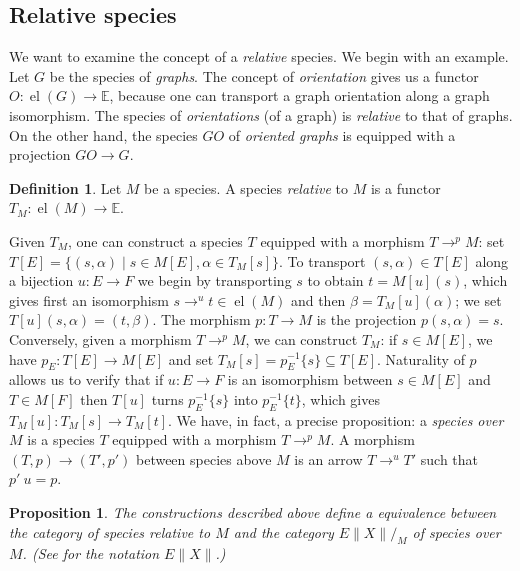 \documentclass{amsart}
\newtheorem{prop}[thm]{Proposition}
\theoremstyle{definition}
\newtheorem{defn}[thm]{Definition}
\theoremstyle{remark}
\newcommand{\E}{\mathbb{E}}
\DeclareMathOperator{\el}{el}
\newcommand{\term}[1]{\emph{#1}}
\newcommand{\pref}[1]{\prettyref{#1}}
\begin{document}
\subsection{Relative species}
\label{sec:relative-species}

We want to examine the concept of a \emph{relative} species. We begin
with an example. Let $G$ be the species of \emph{graphs}. The concept
of \emph{orientation} gives us a functor $O : \el (G) \to \E$, because
one can transport a graph orientation along a graph isomorphism. The
species of \emph{orientations} (of a graph) is \emph{relative} to that
of graphs. On the other hand, the species $GO$ of \emph{oriented
  graphs} is equipped with a projection $GO \to G$.

\begin{defn}
  Let $M$ be a species. A species \emph{relative} to $M$ is a functor
  $T_M : \el (M) \to \E$.
\end{defn}

Given $T_M$, one can construct a species $T$
equipped with a morphism $T \to^p M$: set $T [E] = \{(s, \alpha) \mid
s \in M [E], \alpha \in T_M[s]\}$. To transport $(s, \alpha) \in T[E]$
along a bijection $u : E \to F$ we begin by transporting $s$ to obtain
$t = M [u] (s)$, which gives first an isomorphism $s \to^u t \in
\el(M)$ and then $\beta = T_M [u] (\alpha)$; we set $T [u] (s, \alpha)
= (t, \beta)$. The morphism $p : T \to M$ is the projection $p (s,
\alpha) = s$. Conversely, given a morphism $T \to^p M$, we can
construct $T_M$: if $s \in M [E]$, we have $p_E: T [E] \to M [E]$ and
set $T_M [s] = p_E^{-1}\{s\} \subseteq T [E]$. Naturality of $p$
allows us to verify that if $u : E \to F$ is an isomorphism between $s
\in M [E]$ and $T \in M [F]$ then $T [u]$ turns $p_E^{-1} \{s\}$ into
$p_E^{-1} \{t\}$, which gives $T_M [u] : T_M [s] \to T_M [t]$. We
have, in fact, a precise proposition: a \term{species over $M$} is a
species $T$ equipped with a morphism $T \to^p M$. A morphism $(T, p)
\to (T', p')$ between species above $M$ is an arrow $T \to^u T'$ such
that $p'\ u = p$.

\begin{prop}
  The constructions described above define a equivalence between the
  category of species relative to $M$ and the category $E \|X\|/_M$ of
  species over $M$. \emph{(See \pref{sec:combinatorial-operations} for the
  notation $E\|X\|$.)}
\end{prop}
\end{document}
